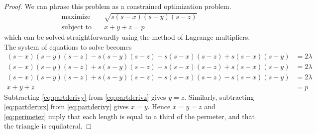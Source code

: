 \documentclass[letterpaper,11pt]{article}
\begin{document}
\begin{proof}
  We can phrase this problem as a constrained optimization problem.
  \begin{align*}
    \text{maximize} &\quad \sqrt{s(s-x)(s-y)(s-z)} \\
    \text{subject to} &\quad x + y + z = p
  \end{align*}
  which can be solved straightforwardly using the method of Lagrange
  multipliers. The system of equations to solve becomes
  \begin{align}
    (s-x)(s-y)(s-z) - s(s-y)(s-z) + s(s-x)(s-z) + s(s-x)(s-y) & = 2 \lambda
    \label{eq:partderivx} \\
    (s-x)(s-y)(s-z) + s(s-y)(s-z) - s(s-x)(s-z) + s(s-x)(s-y) & = 2 \lambda
    \label{eq:partderivy} \\
    (s-x)(s-y)(s-z) + s(s-y)(s-z) + s(s-x)(s-z) - s(s-x)(s-y) & = 2 \lambda
    \label{eq:partderivz} \\
    x + y + z & = p
    \label{eq:perimeter}
  \end{align}
  Subtracting \eqref{eq:partderivy} from \eqref{eq:partderivz} gives $y = z$.
  Similarly, subtracting \eqref{eq:partderivx} from \eqref{eq:partderivy} gives
  $x = y$. Hence $x = y = z$ and \eqref{eq:perimeter} imply that each length is
  equal to a third of the permeter, and that the triangle is equilateral.
\end{proof}
\end{document}
